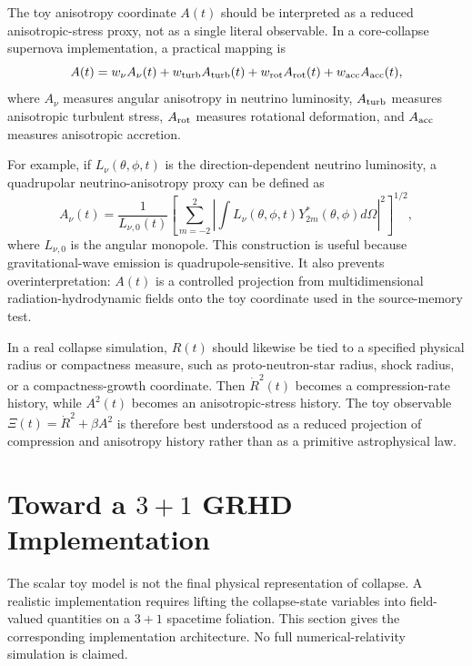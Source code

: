\documentclass[11pt]{article}
\begin{document}
The toy anisotropy coordinate \(A(t)\) should be interpreted as a reduced anisotropic-stress proxy, not as a single literal observable. In a core-collapse supernova implementation, a practical mapping is
\begin{equation}
A(t)=w_\nu A_\nu(t)+w_{\rm turb}A_{\rm turb}(t)+w_{\rm rot}A_{\rm rot}(t)+w_{\rm acc}A_{\rm acc}(t),
\end{equation}
where \(A_\nu\) measures angular anisotropy in neutrino luminosity, \(A_{\rm turb}\) measures anisotropic turbulent stress, \(A_{\rm rot}\) measures rotational deformation, and \(A_{\rm acc}\) measures anisotropic accretion.

For example, if \(L_\nu(\theta,\phi,t)\) is the direction-dependent neutrino luminosity, a quadrupolar neutrino-anisotropy proxy can be defined as
\begin{equation}
A_\nu(t)=\frac{1}{L_{\nu,0}(t)}\left[\sum_{m=-2}^{2}\left|\int L_\nu(\theta,\phi,t)Y_{2m}^{\ast}(\theta,\phi)d\Omega\right|^2\right]^{1/2},
\end{equation}
where \(L_{\nu,0}\) is the angular monopole. This construction is useful because gravitational-wave emission is quadrupole-sensitive. It also prevents overinterpretation: \(A(t)\) is a controlled projection from multidimensional radiation-hydrodynamic fields onto the toy coordinate used in the source-memory test.

In a real collapse simulation, \(R(t)\) should likewise be tied to a specified physical radius or compactness measure, such as proto-neutron-star radius, shock radius, or a compactness-growth coordinate. Then \(\dot R^2(t)\) becomes a compression-rate history, while \(A^2(t)\) becomes an anisotropic-stress history. The toy observable \(\Xi(t)=\dot R^2+\beta A^2\) is therefore best understood as a reduced projection of compression and anisotropy history rather than as a primitive astrophysical law.

\section{Toward a \texorpdfstring{\(3+1\)}{3+1} GRHD Implementation}
\label{sec:grhd_implementation}

The scalar toy model is not the final physical representation of collapse. A realistic implementation requires lifting the collapse-state variables into field-valued quantities on a \(3+1\) spacetime foliation. This section gives the corresponding implementation architecture. No full numerical-relativity simulation is claimed.
\end{document}
